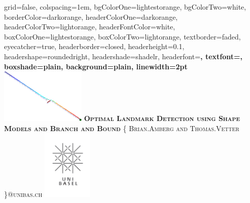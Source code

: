 \documentclass[portrait,final,a0paper,fontscale=0.277]{baposter}
\begin{document}


\begin{poster}%
  {
  grid=false,
  colspacing=1em,
  bgColorOne=lightestorange,
  bgColorTwo=white,
  borderColor=darkorange,
  headerColorOne=darkorange,
  headerColorTwo=lightorange,
  headerFontColor=white,
  boxColorOne=lightestorange,
  boxColorTwo=lightorange,
  textborder=faded,
  eyecatcher=true,
  headerborder=closed,
  headerheight=0.1\textheight,
  headershape=roundedright,
  headershade=shadelr,
  headerfont=\Large\bf\textsc, %
  textfont={\setlength{\parindent}{1.5em}},
  boxshade=plain,
  background=plain,
  linewidth=2pt
  }
  {\includegraphics[height=7em]{images/search_tree_ex1-crop.pdf}} 
  {\bf\textsc{Optimal Landmark Detection using Shape Models and Branch and Bound}\vspace{0.5em}}
  {\textsc{\{ Brian.Amberg and Thomas.Vetter \}@unibas.ch}}
  {%
    \includegraphics[height=9.0em]{images/logo}
  }


\end{poster}
\end{document}
